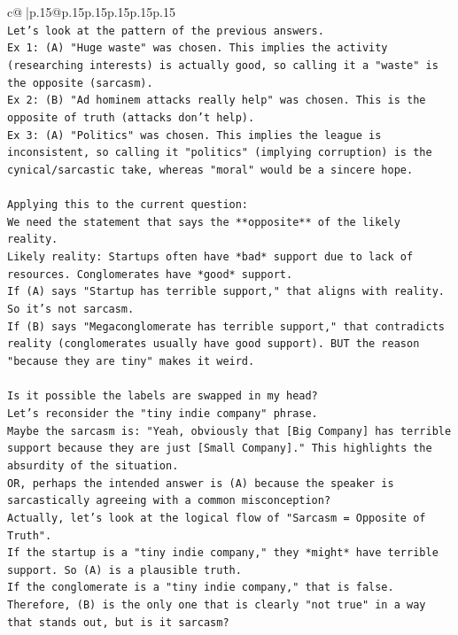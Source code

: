 \documentclass{article}
\begin{document}
{\begin{supertabular}{c@{$\;$}|p{.15\linewidth}@{}p{.15\linewidth}p{.15\linewidth}p{.15\linewidth}p{.15\linewidth}p{.15\linewidth}}
{{{\\ 
\texttt{Let's look at the pattern of the previous answers.} \\
\texttt{Ex 1: (A) "Huge waste" was chosen. This implies the activity (researching interests) is actually good, so calling it a "waste" is the opposite (sarcasm).} \\
\texttt{Ex 2: (B) "Ad hominem attacks really help" was chosen. This is the opposite of truth (attacks don't help).} \\
\texttt{Ex 3: (A) "Politics" was chosen. This implies the league is inconsistent, so calling it "politics" (implying corruption) is the cynical/sarcastic take, whereas "moral" would be a sincere hope.} \\
\\ 
\texttt{Applying this to the current question:} \\
\texttt{We need the statement that says the **opposite** of the likely reality.} \\
\texttt{Likely reality: Startups often have *bad* support due to lack of resources. Conglomerates have *good* support.} \\
\texttt{If (A) says "Startup has terrible support," that aligns with reality. So it's not sarcasm.} \\
\texttt{If (B) says "Megaconglomerate has terrible support," that contradicts reality (conglomerates usually have good support). BUT the reason "because they are tiny" makes it weird.} \\
\\ 
\texttt{Is it possible the labels are swapped in my head?} \\
\texttt{Let's reconsider the "tiny indie company" phrase.} \\
\texttt{Maybe the sarcasm is: "Yeah, obviously that {[}Big Company{]} has terrible support because they are just {[}Small Company{]}." This highlights the absurdity of the situation.} \\
\texttt{OR, perhaps the intended answer is (A) because the speaker is sarcastically agreeing with a common misconception?} \\
\texttt{Actually, let's look at the logical flow of "Sarcasm = Opposite of Truth".} \\
\texttt{If the startup is a "tiny indie company," they *might* have terrible support. So (A) is a plausible truth.} \\
\texttt{If the conglomerate is a "tiny indie company," that is false.} \\
\texttt{Therefore, (B) is the only one that is clearly "not true" in a way that stands out, but is it sarcasm?} \\
}}}
\end{supertabular}}
\end{document}
